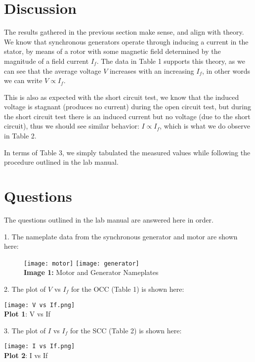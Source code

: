 \documentclass[]{report}
\begin{document}
\section*{Discussion}
The results gathered in the previous section make sense, and align with theory. We know that synchronous generators operate through inducing a current in the stator, by means of a rotor with some magnetic field determined by the magnitude of a field current $I_f$. The data in Table 1 supports this theory, as we can see that the average voltage $V$ increases with an increasing $I_f$, in other words we can write $V \propto I_f$.

This is also as expected with the short circuit test, we know that the induced voltage is stagnant (produces no current) during the open circuit test, but during the short circuit test there is an induced current but no voltage (due to the short circuit), thus we should see similar behavior: $I \propto I_f$, which is what we do observe in Table 2.

In terms of Table 3, we simply tabulated the measured values while following the procedure outlined in the lab manual.

\section*{Questions}

The questions outlined in the lab manual are answered here in order.

1. The nameplate data from the synchronous generator and motor are shown here:

\begin{figure}[H]
	\centering
	\texttt{[image: motor]}
	\texttt{[image: generator]} \\
	\textbf{Image 1:} Motor and Generator Nameplates
\end{figure}

2. The plot of $V$ vs $I_f$ for the OCC (Table 1) is shown here:

\begin{center}
	\centering
	\texttt{[image: V vs If.png]} \\
	\textbf{Plot 1}: V vs If
\end{center}

3. The plot of $I$ vs $I_f$ for the SCC (Table 2) is shown here:

\begin{center}
	\centering
	\texttt{[image: I vs If.png]} \\
	\textbf{Plot 2}: I vs If
\end{center}
\end{document}
